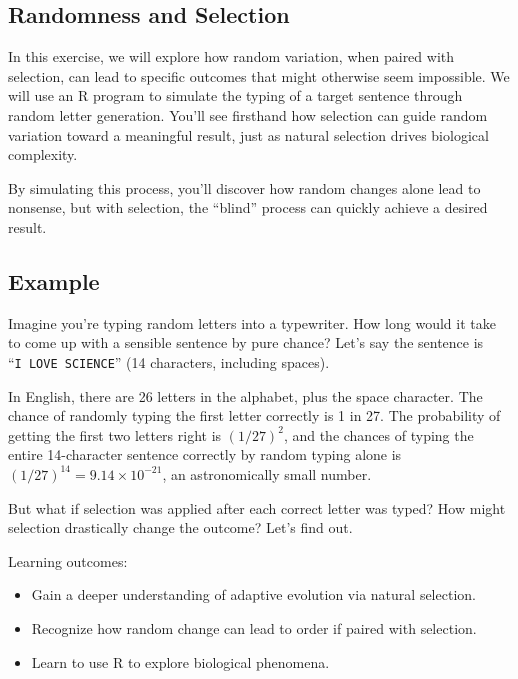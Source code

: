 \documentclass[
  a4paper]{book}
\providecommand{\tightlist}{%
  \setlength{\itemsep}{0pt}\setlength{\parskip}{0pt}}
\begin{document}
\subsection{Randomness and Selection}\label{randomness-and-selection}

In this exercise, we will explore how random variation, when paired with selection, can lead to specific outcomes that might otherwise seem impossible. We will use an R program to simulate the typing of a target sentence through random letter generation. You'll see firsthand how selection can guide random variation toward a meaningful result, just as natural selection drives biological complexity.

By simulating this process, you'll discover how random changes alone lead to nonsense, but with selection, the ``blind'' process can quickly achieve a desired result.

\subsection{Example}\label{example}

Imagine you're typing random letters into a typewriter. How long would it take to come up with a sensible sentence by pure chance? Let's say the sentence is ``\texttt{I\ LOVE\ SCIENCE}'' (14 characters, including spaces).

In English, there are 26 letters in the alphabet, plus the space character. The chance of randomly typing the first letter correctly is 1 in 27. The probability of getting the first two letters right is \((1/27)^2\), and the chances of typing the entire 14-character sentence correctly by random typing alone is \((1/27)^{14} = 9.14 \times 10^{-21}\), an astronomically small number.

But what if selection was applied after each correct letter was typed? How might selection drastically change the outcome? Let's find out.

\begin{do-something}
Learning outcomes:

\begin{itemize}
\tightlist
\item
  Gain a deeper understanding of adaptive evolution via natural
  selection.
\item
  Recognize how random change can lead to order if paired with
  selection.
\item
  Learn to use R to explore biological phenomena.
\end{itemize}
\end{do-something}
\end{document}
